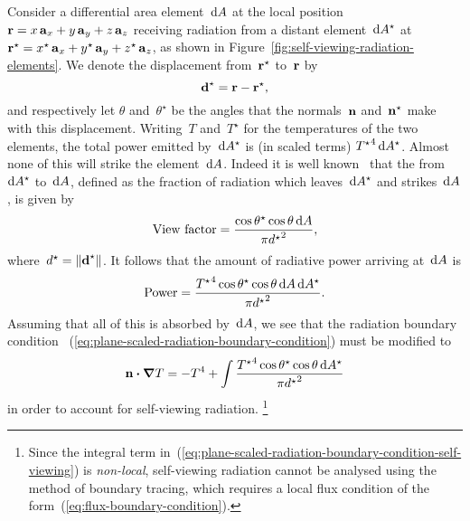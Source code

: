 Consider a differential area element~$\mathop{}\!\mathrm{d} A$ at the local position~%
$\boldsymbol{\mathbf{r}} = x \mathop{}\!\boldsymbol{\mathbf{a}}_{x} + y \mathop{}\!\boldsymbol{\mathbf{a}}_{y} + z \mathop{}\!\boldsymbol{\mathbf{a}}_{z}$
receiving radiation from a distant element~$\mathop{}\!\mathrm{d} A^\star$ at~%
$\boldsymbol{\mathbf{r}}^\star =
  x^\star \mathop{}\!\boldsymbol{\mathbf{a}}_{x} + y^\star \mathop{}\!\boldsymbol{\mathbf{a}}_{y} + z^\star \mathop{}\!\boldsymbol{\mathbf{a}}_{z}$,
as shown in Figure~\ref{fig:self-viewing-radiation-elements}.
We denote the displacement from~$\boldsymbol{\mathbf{r}}^\star$ to~$\boldsymbol{\mathbf{r}}$ by
\begin{equation}
  \boldsymbol{\mathbf{d}}^\star = \boldsymbol{\mathbf{r}} - \boldsymbol{\mathbf{r}}^\star,
  \label{eq:radiation-self-viewing-displacement}
\end{equation}
and respectively let $\theta$ and~$\theta^\star$ be the angles
that the normals~$\mathop{}\!\boldsymbol{\mathbf{n}}$ and~$\mathop{}\!\boldsymbol{\mathbf{n}}^\star$
make with this displacement.
Writing~$T$ and~$T^\star$ for the temperatures of the two elements,
the total power emitted by~$\mathop{}\!\mathrm{d} A^\star$
is (in scaled terms) ${T^\star}^4 \mathop{}\!\mathrm{d} A^\star$.
Almost none of this will strike the element~$\mathop{}\!\mathrm{d} A$.
Indeed it is well known~\cite{howell-2010-thermal-radiation-heat-transfer}
that the  from~$\mathop{}\!\mathrm{d} A^\star$ to~$\mathop{}\!\mathrm{d} A$,
defined as the fraction of radiation which leaves~$\mathop{}\!\mathrm{d} A^\star$
and strikes~$\mathop{}\!\mathrm{d} A$,
is given by
\begin{equation}
  \textnormal{View factor} =
    \frac{\cos\theta^\star \cos\theta \mathop{}\!\mathrm{d} A}{\pi {d^\star}^2},
  \label{eq:radiation-self-viewing-view-factor}
\end{equation}
where~$d^\star = \lVert\boldsymbol{\mathbf{d}}^\star\rVert$.
It follows that the amount of radiative power arriving at~$\mathop{}\!\mathrm{d} A$ is
\begin{equation}
  \textnormal{Power} =
    \frac{
      {T^\star}^4 \cos\theta^\star \cos\theta \mathop{}\!\mathrm{d} A \mathop{}\!\mathrm{d} A^\star
    }{
      \pi {d^\star}^2
    }.
  \label{eq:self-viewing-power}
\end{equation}
Assuming that all of this is absorbed by~$\mathop{}\!\mathrm{d} A$,
we see that the radiation boundary condition~%
  (\ref{eq:plane-scaled-radiation-boundary-condition})
must be modified to
\begin{equation}
  \mathop{}\!\boldsymbol{\mathbf{n}} \boldsymbol{\cdot} \mathop{}\!\boldsymbol{\mathbf{\nabla}} T =
    -T^4 +
    \int
      \frac{
        {T^\star}^4 \cos\theta^\star \cos\theta \mathop{}\!\mathrm{d} A^\star
      }{
        \pi {d^\star}^2
      }
  \label{eq:plane-scaled-radiation-boundary-condition-self-viewing}
\end{equation}
in order to account for self-viewing radiation.%
\footnote{
  Since the integral term
  in~(\ref{eq:plane-scaled-radiation-boundary-condition-self-viewing})
  is \emph{non-local},
  self-viewing radiation cannot be analysed
  using the method of boundary tracing,
  which requires a local flux condition
  of the form~(\ref{eq:flux-boundary-condition}).
}
